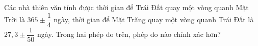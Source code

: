 \begin{ex}
Các nhà thiên văn tính được thời gian để Trái Đất quay một vòng quanh Mặt Trời là $365\pm\dfrac14$ ngày, thời gian để Mặt Trăng quay một vòng quanh Trái Đất là $27{,}3\pm\dfrac1{50}$ ngày. Trong hai phép đo trên, phép đo nào chính xác hơn?
\end{ex}
